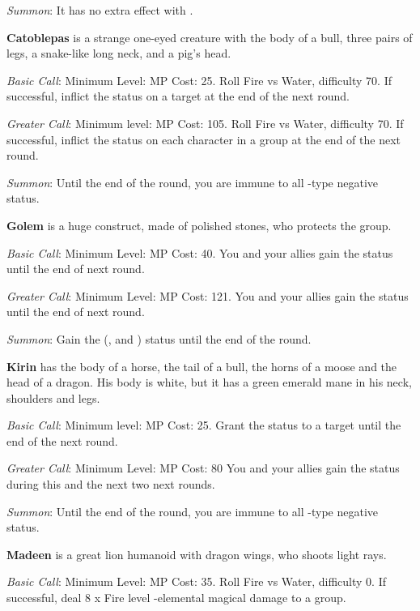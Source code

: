 \begin{multicols}{2}
    \textit{Summon}: It has no extra effect with .
    
    \textbf{Catoblepas} is a strange one-eyed creature with the body of a bull, three pairs of legs, a snake-like long neck, and a pig's head.
    
    \textit{Basic Call}: Minimum Level:  MP Cost: 25. Roll Fire vs Water, difficulty 70. If successful, inflict the  status on a target at the end of the next round.
    
    \textit{Greater Call}: Minimum level:  MP Cost: 105. Roll Fire vs Water, difficulty 70. If successful, inflict the  status on each character in a group at the end of the next round.
    
    \textit{Summon}: Until the end of the round, you are immune to all -type negative status.
    
    \textbf{Golem} is a huge construct, made of polished stones, who protects the group.
    
    \textit{Basic Call}: Minimum Level:  MP Cost: 40. You and your allies gain the  status until the end of next round.
    
    \textit{Greater Call}: Minimum Level:  MP Cost: 121. You and your allies gain the  status until the end of next round.
    
    \textit{Summon}: Gain the  (,  and ) status until the end of the round.
    
    \textbf{Kirin} has the body of a horse, the tail of a bull, the horns of a moose and the head of a dragon. His body is white, but it has a green emerald mane in his neck, shoulders and legs.
    
    \textit{Basic Call}: Minimum level:  MP Cost: 25. Grant the  status to a target until the end of the next round.
    
    \textit{Greater Call}: Minimum Level:  MP Cost: 80 You and your allies gain the  status during this and the next two next rounds.
    
    \textit{Summon}: Until the end of the round, you are immune to all -type negative status.
    
   \textbf{Madeen} is a great lion humanoid with dragon wings, who shoots light rays.
    
    \textit{Basic Call}: Minimum Level:  MP Cost: 35. Roll Fire vs Water, difficulty 0. If successful, deal 8 x Fire level -elemental magical damage to a group.
    

\end{multicols}
